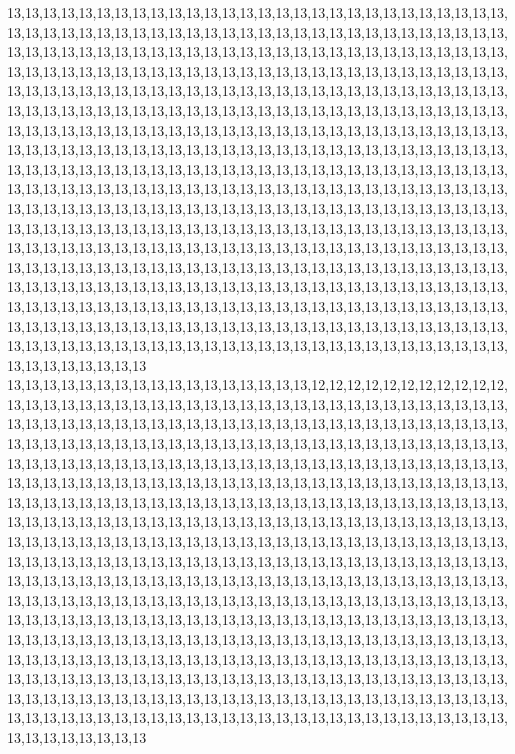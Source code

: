 13,13,13,13,13,13,13,13,13,13,13,13,13,13,13,13,13,13,13,13,13,13,13,13,13,13,13,13,13,13,13,13,13,13,13,13,13,13,13,13,13,13,13,13,13,13,13,13,13,13,13,13,13,13,13,13,13,13,13,13,13,13,13,13,13,13,13,13,13,13,13,13,13,13,13,13,13,13,13,13,13,13,13,13,13,13,13,13,13,13,13,13,13,13,13,13,13,13,13,13,13,13,13,13,13,13,13,13,13,13,13,13,13,13,13,13,13,13,13,13,13,13,13,13,13,13,13,13,13,13,13,13,13,13,13,13,13,13,13,13,13,13,13,13,13,13,13,13,13,13,13,13,13,13,13,13,13,13,13,13,13,13,13,13,13,13,13,13,13,13,13,13,13,13,13,13,13,13,13,13,13,13,13,13,13,13,13,13,13,13,13,13,13,13,13,13,13,13,13,13,13,13,13,13,13,13,13,13,13,13,13,13,13,13,13,13,13,13,13,13,13,13,13,13,13,13,13,13,13,13,13,13,13,13,13,13,13,13,13,13,13,13,13,13,13,13,13,13,13,13,13,13,13,13,13,13,13,13,13,13,13,13,13,13,13,13,13,13,13,13,13,13,13,13,13,13,13,13,13,13,13,13,13,13,13,13,13,13,13,13,13,13,13,13,13,13,13,13,13,13,13,13,13,13,13,13,13,13,13,13,13,13,13,13,13,13,13,13,13,13,13,13,13,13,13,13,13,13,13,13,13,13,13,13,13,13,13,13,13,13,13,13,13,13,13,13,13,13,13,13,13,13,13,13,13,13,13,13,13,13,13,13,13,13,13,13,13,13,13,13,13,13,13,13,13,13,13,13,13,13,13,13,13,13,13,13,13,13,13,13,13,13,13,13,13,13,13,13,13,13,13,13,13,13,13,13,13,13,13,13,13,13,13,13,13,13,13,13,13,13,13,13,13,13,13,13,13,13,13,13,13,13,13,13,13,13,13,13,13,13,13,13,13,13,13,13,13,13,13,13,13,13,13,13,13,13,13,13,13,13,13,13,13,13,13,13,13,13,13,13,13,13,13,13,13,13,13,13,13,13,13,13,13,13,13,13,13,13,13,13,13,13,13,13,13,13,13,13,13,13,13,13,13,13,13,13,13,13,13,13,13,13
13,13,13,13,13,13,13,13,13,13,13,13,13,13,13,13,13,12,12,12,12,12,12,12,12,12,12,12,13,13,13,13,13,13,13,13,13,13,13,13,13,13,13,13,13,13,13,13,13,13,13,13,13,13,13,13,13,13,13,13,13,13,13,13,13,13,13,13,13,13,13,13,13,13,13,13,13,13,13,13,13,13,13,13,13,13,13,13,13,13,13,13,13,13,13,13,13,13,13,13,13,13,13,13,13,13,13,13,13,13,13,13,13,13,13,13,13,13,13,13,13,13,13,13,13,13,13,13,13,13,13,13,13,13,13,13,13,13,13,13,13,13,13,13,13,13,13,13,13,13,13,13,13,13,13,13,13,13,13,13,13,13,13,13,13,13,13,13,13,13,13,13,13,13,13,13,13,13,13,13,13,13,13,13,13,13,13,13,13,13,13,13,13,13,13,13,13,13,13,13,13,13,13,13,13,13,13,13,13,13,13,13,13,13,13,13,13,13,13,13,13,13,13,13,13,13,13,13,13,13,13,13,13,13,13,13,13,13,13,13,13,13,13,13,13,13,13,13,13,13,13,13,13,13,13,13,13,13,13,13,13,13,13,13,13,13,13,13,13,13,13,13,13,13,13,13,13,13,13,13,13,13,13,13,13,13,13,13,13,13,13,13,13,13,13,13,13,13,13,13,13,13,13,13,13,13,13,13,13,13,13,13,13,13,13,13,13,13,13,13,13,13,13,13,13,13,13,13,13,13,13,13,13,13,13,13,13,13,13,13,13,13,13,13,13,13,13,13,13,13,13,13,13,13,13,13,13,13,13,13,13,13,13,13,13,13,13,13,13,13,13,13,13,13,13,13,13,13,13,13,13,13,13,13,13,13,13,13,13,13,13,13,13,13,13,13,13,13,13,13,13,13,13,13,13,13,13,13,13,13,13,13,13,13,13,13,13,13,13,13,13,13,13,13,13,13,13,13,13,13,13,13,13,13,13,13,13,13,13,13,13,13,13,13,13,13,13,13,13,13,13,13,13,13,13,13,13,13,13,13,13,13,13,13,13,13,13,13,13,13,13,13,13,13,13,13,13,13,13,13,13,13,13,13,13,13,13,13,13,13,13,13,13,13,13,13,13,13,13,13,13,13,13,13,13,13,13,13,13,13,13,13
